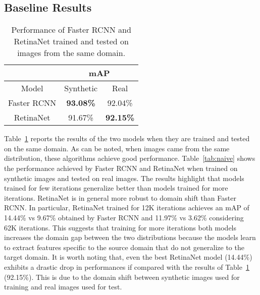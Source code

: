 \documentclass[preprint]{elsarticle}
\begin{document}
\subsection{Baseline Results}
\begin{table}[t]
\caption{Performance of Faster RCNN and RetinaNet trained and tested on images from the same domain.}
\label{oracle}
\centering
\begin{tabular}{|c||c||c|}
\hline
 & \multicolumn{2}{c|}{mAP} \\
\hline
Model & Synthetic & Real\\
\hline
Faster RCNN & \textbf{93.08\%} & 92.04\%\\
\hline
RetinaNet & 91.67\% & \textbf{92.15\%}\\
\hline
\end{tabular}
\end{table}
\begin{table}[t]
\setlength{\tabcolsep}{1.5pt}
\caption{Performance of Faster RCNN and RetinaNet trained on synthetic images for a different amounts of iterations and tested on real images.}
\label{tab:naive}
\centering
{}
\end{table}
Table~\ref{oracle} reports the results of the two models when they are trained and tested on the same domain. As can be noted, when images came from the same distribution, these algorithms achieve good performance. Table~\ref{tab:naive} shows the performance achieved by Faster RCNN and RetinaNet when trained on synthetic images and tested on real images. The results highlight that models trained for few iterations generalize better than models trained for more iterations. RetinaNet is in general more robust to domain shift than Faster RCNN. In particular, RetinaNet trained for 12K iterations achieves an mAP of 14.44\% vs 9.67\% obtained by Faster RCNN and 11.97\% vs 3.62\% considering 62K iterations. This suggests that training for more iterations both models increases the domain gap between the two distributions because the models learn to extract features specific to the source domain that do not generalize to the target domain. It is worth noting that, even the best RetinaNet model (14.44\%) exhibits a drastic drop in performances if compared with the results of Table~\ref{oracle} (92.15\%). This is due to the domain shift between synthetic images used for training and real images used for test.
\end{document}
